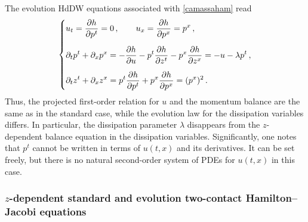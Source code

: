 \documentclass[11pt,twoside]{article}
\theoremstyle{plain}
\theoremstyle{definition}
\theoremstyle{remark}
\begin{document}
 

The evolution HdDW equations associated with \eqref{camassaham} read
\begin{equation}\label{eq:wave_evol_HdDW}
\begin{dcases}
u_t=\frac{\partial h}{\partial p^t}=0\,,\qquad
u_x=\frac{\partial h}{\partial p^x}=p^x\,,\\[2mm]
\partial_t p^t+\partial_x p^x=-\frac{\partial h}{\partial u}-p^t\frac{\partial h}{\partial z^t}-p^x\frac{\partial h}{\partial z^x}=-u-\lambda p^t\,,\\[2mm]
\partial_t z^t+\partial_x z^x
=
p^t\frac{\partial h}{\partial p^t}+p^x\frac{\partial h}{\partial p^x}
=
(p^x)^2\,.
\end{dcases}
\end{equation}
Thus, the projected first-order relation for $u$ and the momentum balance are the same as in the standard case, while the evolution law for the dissipation variables differs. In particular, the dissipation parameter $\lambda$ disappears from the  $z$-dependent balance equation in the dissipation variables. Significantly, one notes that $p^t$ cannot be written in terms of $u(t,x)$ and its derivatives. It can be set freely, but there is no natural second-order system of PDEs for $u(t,x)$ in this case. 

 

\subsubsection{\texorpdfstring{$z$}{}-dependent standard and evolution two-contact Hamilton--Jacobi equations}
\end{document}
